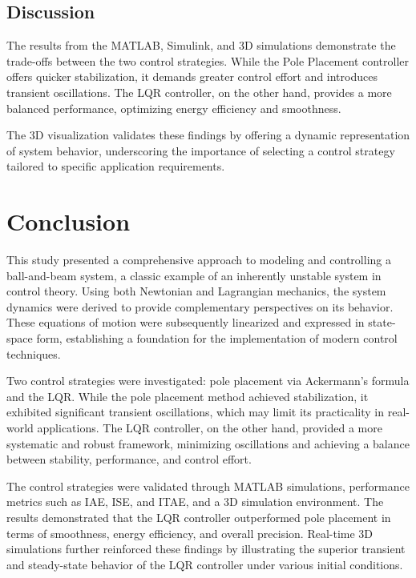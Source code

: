 \documentclass[conference]{IEEEtran}
\begin{document}
\subsection{Discussion}
The results from the MATLAB, Simulink, and 3D simulations demonstrate the trade-offs between the two control strategies. While the Pole Placement controller offers quicker stabilization, it demands greater control effort and introduces transient oscillations. The LQR controller, on the other hand, provides a more balanced performance, optimizing energy efficiency and smoothness. 

The 3D visualization validates these findings by offering a dynamic representation of system behavior, underscoring the importance of selecting a control strategy tailored to specific application requirements.


\section{Conclusion}
\label{sec:conclusion}

This study presented a comprehensive approach to modeling and controlling a ball-and-beam system, a classic example of an inherently unstable system in control theory. Using both Newtonian and Lagrangian mechanics, the system dynamics were derived to provide complementary perspectives on its behavior. These equations of motion were subsequently linearized and expressed in state-space form, establishing a foundation for the implementation of modern control techniques.

Two control strategies were investigated: pole placement via Ackermann’s formula and the LQR. While the pole placement method achieved stabilization, it exhibited significant transient oscillations, which may limit its practicality in real-world applications. The LQR controller, on the other hand, provided a more systematic and robust framework, minimizing oscillations and achieving a balance between stability, performance, and control effort.

The control strategies were validated through MATLAB simulations, performance metrics such as IAE, ISE, and ITAE, and a 3D simulation environment. The results demonstrated that the LQR controller outperformed pole placement in terms of smoothness, energy efficiency, and overall precision. Real-time 3D simulations further reinforced these findings by illustrating the superior transient and steady-state behavior of the LQR controller under various initial conditions.
\end{document}
